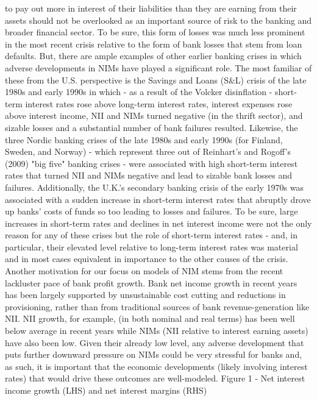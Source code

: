 \documentclass[12pt]{article}
\begin{document}
{to pay out more in interest of their liabilities than they are earning from
their assets should not be overlooked as an important source of risk to the
banking and broader financial sector. To be sure, this form of losses was
much less prominent in the most recent crisis relative to the form of bank
losses that stem from loan defaults. But, there are ample examples of other
earlier banking crises in which adverse developments in NIMs have played a
significant role. The most familiar of these from the U.S. perspective is
the Savings and Loans (S\&L) crisis of the late 1980s and early 1990s in
which - as a result of the Volcker disinflation - short-term interest rates
rose above long-term interest rates, interest expenses rose above interest
income, NII and NIMs turned negative (in the thrift sector), and sizable
losses and a substantial number of bank failures resulted. Likewise, the
three Nordic banking crises of the late 1980s and early 1990s (for Finland,
Sweden, and Norway) - which represent three out of Reinhart's and Rogoff's
(2009) "big five" banking crises - were associated with high short-term
interest rates that turned NII and NIMs negative and lead to sizable bank
losses and failures. Additionally, the U.K.'s secondary banking crisis of
the early 1970s was associated with a sudden increase in short-term interest
rates that abruptly drove up banks' costs of funds so too leading to losses
and failures. To be sure, large increases in short-term rates and declines
in net interest income were not the only reason for any of these crises but
the role of short-term interest rates - and, in particular, their elevated
level relative to long-term interest rates was material and in most cases
equivalent in importance to the other causes of the crisis. Another
motivation for our focus on models of NIM stems from the recent lackluster
pace of bank profit growth. Bank net income growth in recent years has been
largely supported by unsustainable cost cutting and reductions in
provisioning, rather than from traditional sources of bank
revenue-generation like NII. NII growth, for example, (in both nominal and
real terms) has been well below average in recent years while NIMs (NII
relative to interest earning assets) have also been low. Given their already
low level, any adverse development that puts further downward pressure on
NIMs could be very stressful for banks and, as such, it is important that
the economic developments (likely involving interest rates) that would drive
these outcomes are well-modeled. Figure 1 - Net interest income growth (LHS)
and net interest margins (RHS) }
\end{document}
